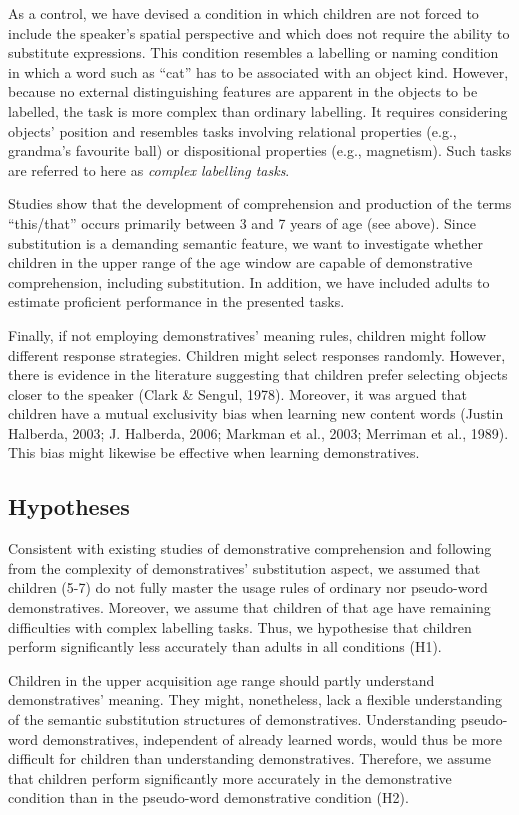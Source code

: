 \documentclass[
  man,floatsintext]{apa6}
\begin{document}
As a control, we have devised a condition in which children are not forced to include the speaker's spatial perspective and which does not require the ability to substitute expressions. This condition resembles a labelling or naming condition in which a word such as ``cat'' has to be associated with an object kind. However, because no external distinguishing features are apparent in the objects to be labelled, the task is more complex than ordinary labelling. It requires considering objects' position and resembles tasks involving relational properties (e.g., grandma's favourite ball) or dispositional properties (e.g., magnetism). Such tasks are referred to here as \emph{complex labelling tasks}.

Studies show that the development of comprehension and production of the terms ``this/that'' occurs primarily between 3 and 7 years of age (see above). Since substitution is a demanding semantic feature, we want to investigate whether children in the upper range of the age window are capable of demonstrative comprehension, including substitution. In addition, we have included adults to estimate proficient performance in the presented tasks.

Finally, if not employing demonstratives' meaning rules, children might follow different response strategies. Children might select responses randomly. However, there is evidence in the literature suggesting that children prefer selecting objects closer to the speaker (Clark \& Sengul, 1978). Moreover, it was argued that children have a mutual exclusivity bias when learning new content words (Justin Halberda, 2003; J. Halberda, 2006; Markman et al., 2003; Merriman et al., 1989). This bias might likewise be effective when learning demonstratives.

\subsection{Hypotheses}\label{hypotheses}

Consistent with existing studies of demonstrative comprehension and following from the complexity of demonstratives' substitution aspect, we assumed that children (5-7) do not fully master the usage rules of ordinary nor pseudo-word demonstratives. Moreover, we assume that children of that age have remaining difficulties with complex labelling tasks. Thus, we hypothesise that children perform significantly less accurately than adults in all conditions (H1).

Children in the upper acquisition age range should partly understand demonstratives' meaning. They might, nonetheless, lack a flexible understanding of the semantic substitution structures of demonstratives. Understanding pseudo-word demonstratives, independent of already learned words, would thus be more difficult for children than understanding demonstratives. Therefore, we assume that children perform significantly more accurately in the demonstrative condition than in the pseudo-word demonstrative condition (H2).
\end{document}
